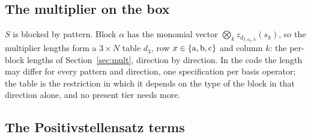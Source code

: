 \subsection{The multiplier on the box}

$S$ is blocked by pattern. Block $\alpha$ has the monomial vector $\bigotimes_kz_{d_{3,\alpha_k,k}}(s_k)$, so the multiplier lengths form a $3\times N$ table $d_3$, row $x\in\{\mathrm{a},\mathrm{b},\mathrm{c}\}$ and column $k$: the per-block lengths of Section~\ref{sec:mult}, direction by direction. In the code the length may differ for every pattern and direction, one specification per basis operator; the table is the restriction in which it depends on the type of the block in that direction alone, and no present tier needs more.

\subsection{The Positivstellensatz terms}\label{sec:terms}

